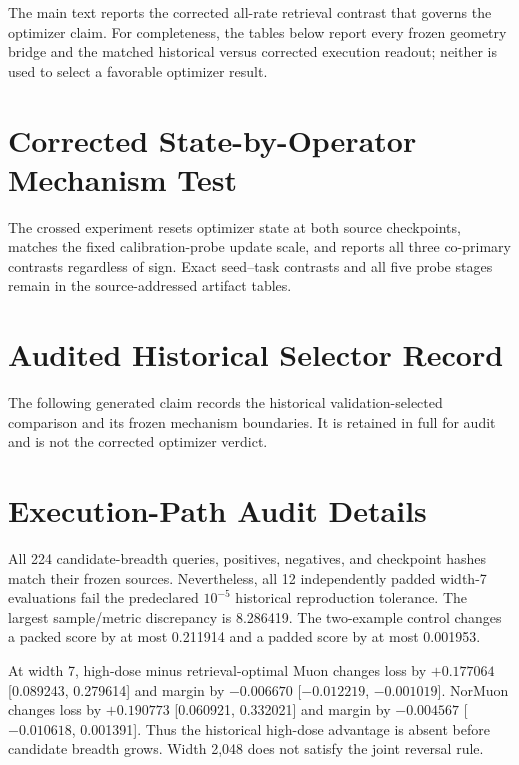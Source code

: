 \documentclass[11pt]{article}
\begin{document}
The main text reports the corrected all-rate retrieval contrast that governs the optimizer claim.
For completeness, the tables below report every frozen geometry bridge and the matched historical
versus corrected execution readout; neither is used to select a favorable optimizer result.

\CorrectedGeometryBridgeTable

\CorrectedExecutionSensitivityTable

\section{Corrected State-by-Operator Mechanism Test}

The crossed experiment resets optimizer state at both source checkpoints, matches the fixed
calibration-probe update scale, and reports all three co-primary contrasts regardless of sign.
Exact seed--task contrasts and all five probe stages remain in the source-addressed artifact tables.

\StateOperatorAppendixTable

\FloatBarrier

\section{Audited Historical Selector Record}
\label{sec:historical-selector-record}

The following generated claim records the historical validation-selected comparison and its frozen
mechanism boundaries. It is retained in full for audit and is not the corrected optimizer verdict.

\ResultConclusion

\CandidateBreadthFigure

\section{Execution-Path Audit Details}
\label{sec:execution-audit-details}

All 224 candidate-breadth queries, positives, negatives, and checkpoint hashes match their frozen
sources. Nevertheless, all 12 independently padded width-7 evaluations fail the predeclared
$10^{-5}$ historical reproduction tolerance. The largest sample/metric discrepancy is 8.286419.
The two-example control changes a packed score by at most 0.211914 and a padded score by at most
0.001953.

At width 7, high-dose minus retrieval-optimal Muon changes loss by $+0.177064$ [0.089243, 0.279614]
and margin by $-0.006670$ [$-0.012219$, $-0.001019$]. NorMuon changes loss by $+0.190773$
[0.060921, 0.332021] and margin by $-0.004567$ [$-0.010618$, 0.001391]. Thus the historical
high-dose advantage is absent before candidate breadth grows. Width 2,048 does not satisfy the
joint reversal rule.
\end{document}
